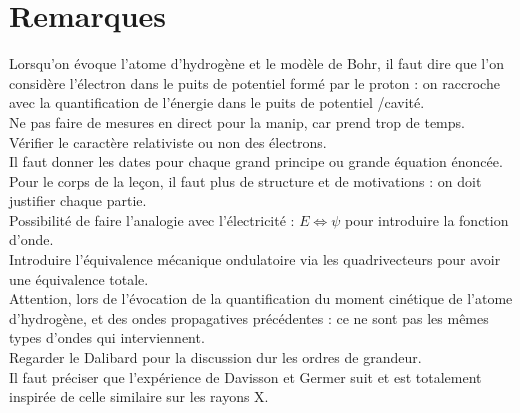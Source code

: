 \documentclass[12pt,prb,aps,epsf]{report}
\begin{document}
\section*{Remarques}
Lorsqu'on évoque l'atome d'hydrogène et le modèle de Bohr, il faut dire que l'on considère l'électron dans le puits de potentiel formé par le proton : on raccroche avec la quantification de l'énergie dans le puits de potentiel /cavité.\\
Ne pas faire de mesures en direct pour la manip, car prend trop de temps. Vérifier le caractère relativiste ou non des électrons.\\
Il faut donner les dates pour chaque grand principe ou grande équation énoncée.\\
Pour le corps de la leçon, il faut plus de structure et de motivations : on doit justifier chaque partie.\\
Possibilité de faire l'analogie avec l'électricité : $E\Leftrightarrow\psi$ pour introduire la fonction d'onde.\\
Introduire l'équivalence mécanique ondulatoire via les quadrivecteurs pour avoir une équivalence totale.\\
Attention, lors de l'évocation de la quantification du moment cinétique de l'atome d'hydrogène, et des ondes propagatives précédentes : ce ne sont pas les mêmes types d'ondes qui interviennent.\\
Regarder le Dalibard pour la discussion dur les ordres de grandeur.\\
Il faut préciser que l'expérience de Davisson et Germer suit et est totalement inspirée de celle similaire sur les rayons X.	
	
\end{document}
